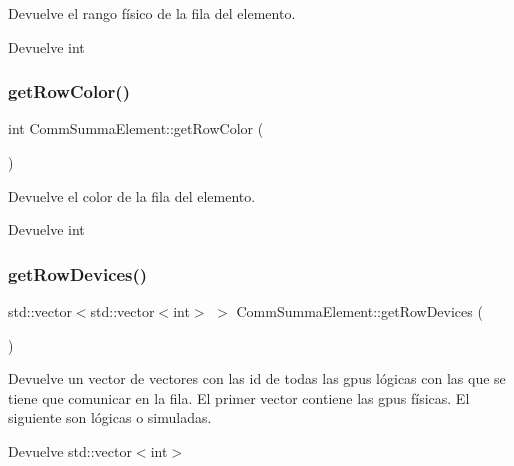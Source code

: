 Devuelve el rango físico de la fila del elemento. 

\begin{DoxyReturn}{Devuelve}
int 
\end{DoxyReturn}
\mbox{\label{classCommSummaElement_a0b58caefd8a5a99cd5f4eef2202668d4}} 
\subsubsection{\texorpdfstring{get\+Row\+Color()}{getRowColor()}}
{\footnotesize\ttfamily int Comm\+Summa\+Element\+::get\+Row\+Color (\begin{DoxyParamCaption}{ }\end{DoxyParamCaption})}



Devuelve el color de la fila del elemento. 

\begin{DoxyReturn}{Devuelve}
int 
\end{DoxyReturn}
\mbox{\label{classCommSummaElement_a9e93a318fd8866b05b57cc951d8bf751}} 
\subsubsection{\texorpdfstring{get\+Row\+Devices()}{getRowDevices()}}
{\footnotesize\ttfamily std\+::vector$<$std\+::vector$<$int$>$ $>$ Comm\+Summa\+Element\+::get\+Row\+Devices (\begin{DoxyParamCaption}{ }\end{DoxyParamCaption})}



Devuelve un vector de vectores con las id de todas las gpus lógicas con las que se tiene que comunicar en la fila. El primer vector contiene las gpus físicas. El siguiente son lógicas o simuladas. 

\begin{DoxyReturn}{Devuelve}
std\+::vector$<$int$>$ 
\end{DoxyReturn}
\mbox{\label{classCommSummaElement_a15fa7d90624407f178b9e08a2406e5c8}} 

